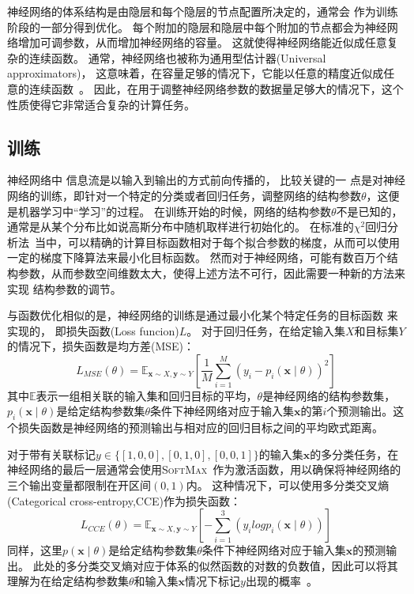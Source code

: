 神经网络的体系结构是由隐层和每个隐层的节点配置所决定的，通常会
作为训练阶段的一部分得到优化。
每个附加的隐层和隐层中每个附加的节点都会为神经网络增加可调参数，从而增加神经网络的容量。
这就使得神经网络能近似成任意复杂的连续函数。
通常，神经网络也被称为通用型估计器(Universal approximators)，
这意味着，在容量足够的情况下，它能以任意的精度近似成任意的连续函数~\cite{MLSV}。
因此，在用于调整神经网络参数的数据量足够大的情况下，这个性质使得它非常适合复杂的计算任务。


\subsection{训练}
\label{sec:Train}

神经网络中
信息流是以输入到输出的方式前向传播的，
比较关键的一
点是对神经网络的训练，即针对一个特定的分类或者回归任务，调整网络的结构参数$\theta$，这便是机器学习中“学习”的过程。
在训练开始的时候，网络的结构参数$\theta$不是已知的，通常是从某个分布比如说高斯分布中随机取样进行初始化的。
在标准的$\chi^2$回归分析法~\cite{WENDT1991275}当中，可以精确的计算目标函数相对于每个拟合参数的梯度，从而可以使用一定的梯度下降算法来最小化目标函数。
然而对于神经网络，可能有数百万个结构参数，从而参数空间维数太大，使得上述方法不可行，因此需要一种新的方法来实现
结构参数的调节。

与函数优化相似的是，神经网络的训练是通过最小化某个特定任务的目标函数
来实现的，%
即损失函数(Loss funcion)$L$。
对于回归任务，在给定输入集$X$和目标集$Y$的情况下，损失函数是均方差(MSE)：
\begin{equation} 
\label{eq:ml2}	
L_{MSE}(\theta) = \mathbb{E}_{\boldsymbol{x} \sim X, \boldsymbol{y} \sim Y} \left[ \frac{1}{M} \sum_{i=1}^M (y_i - p_i (\boldsymbol{x} \mid \theta))^2 \right]
\end{equation}
其中$\mathbb{E}$表示一组相关联的输入集和回归目标的平均，$\theta$是神经网络的结构参数集，$p_i (\boldsymbol{x} \mid \theta)$是给定结构参数集$\theta$条件下神经网络对应于输入集$\boldsymbol{x}$的第$i$个预测输出。这个损失函数是神经网络的预测输出与相对应的回归目标之间的平均欧式距离。

对于带有关联标记$y\in\{[1,0,0],[0,1,0],[0,0,1]\}$的输入集$\boldsymbol{x}$的多分类任务，在神经网络的最后一层通常会使用\textsc{SoftMax}~\cite{MLMIT}作为激活函数，用以确保将神经网络的三个输出变量都限制在开区间$(0,1)$内。
这种情况下，可以使用多分类交叉熵(Categorical cross-entropy,CCE)作为损失函数：
\begin{equation} 
\label{eq:ml3}	
L_{CCE}(\theta) = \mathbb{E}_{\boldsymbol{x} \sim X, \boldsymbol{y} \sim Y} \left[ - \sum_{i=1}^3 (y_i log p_i (\boldsymbol{x} \mid \theta)) \right]
\end{equation}
同样，这里$p(\boldsymbol{x} \mid \theta)$是给定结构参数集$\theta$条件下神经网络对应于输入集$\boldsymbol{x}$的预测输出。
此处的多分类交叉熵对应于体系的似然函数的对数的负数值，因此可以将其理解为在给定结构参数集$\theta$和输入集$\boldsymbol{x}$情况下标记$y$出现的概率~\cite{MLSV}。


